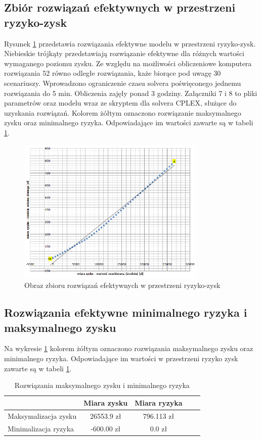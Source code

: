 \documentclass[11pt,a4paper]{article}
\begin{document}
\subsection{Zbiór rozwiązań efektywnych w przestrzeni ryzyko-zysk}
Rysunek \ref{fig:profit-risk} przedstawia rozwiązania efektywne modelu w przestrzeni ryzyko-zysk. Niebieskie trójkąty przedstawiają rozwiązanie efektywne dla różnych wartości wymaganego poziomu zysku. Ze względu na możliwości obliczeniowe komputera rozwiązania 52 równo odległe rozwiązania, każe biorące pod uwagę 30 scenariuszy. Wprowadzono ograniczenie czasu solvera poświęconego jednemu rozwiązania do 5 min. Obliczenia zajęły ponad 3 godziny. Załączniki 7 i 8 to pliki parametrów oraz modelu wraz ze skryptem dla solvera CPLEX, służące do uzyskania rozwiązań. Kolorem żółtym oznaczono rozwiązanie maksymalnego zysku oraz minimalnego ryzyka. Odpowiadające im wartości zawarte są w tabeli \ref{tab:min-max}. 
\begin{figure}[ht!]
\centering
\includegraphics[width=0.8\textwidth]{graphics/results-minAvgProfit-marker}
\caption{Obraz zbioru rozwiązań efektywnych w przestrzeni ryzyko-zysk}
\label{fig:profit-risk}
\end{figure}

\subsection{Rozwiązania efektywne minimalnego ryzyka i maksymalnego zysku}

Na wykresie \ref{fig:profit-risk} kolorem żółtym oznaczono rozwiązania maksymalnego zysku oraz minimalnego ryzyka. Odpowiadające im wartości w przestrzeni ryzyko zysk zawarte są w tabeli \ref{tab:min-max}.

\begin{table}[ht!]
\label{tab:min-max}
  \caption{Rozwiązania maksymalnego zysku i minimalnego ryzyka}
  \centering
  \begin{tabular}{l*{4}{c}}
  
  	\hline
              			& Miara zysku & Miara ryzyka \\
	\hline
	Maksymalizacja zysku	& 26553.9 zł & 796.113 zł \\
	Minimalizacja ryzyka   	& -600.00 zł & 0.0 zł \\ 
	\hline
	
	\end{tabular}
	\end{table}
	
\end{document}
